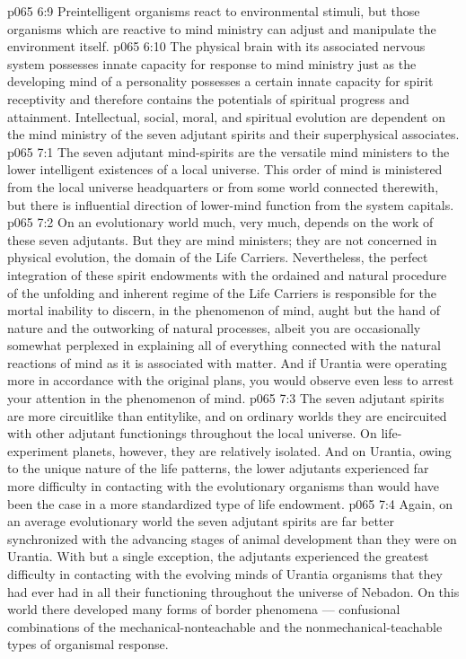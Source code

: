 \vs p065 6:9 Preintelligent organisms react to environmental stimuli, but those organisms which are reactive to mind ministry can adjust and manipulate the environment itself.
\vs p065 6:10 The physical brain with its associated nervous system possesses innate capacity for response to mind ministry just as the developing mind of a personality possesses a certain innate capacity for spirit receptivity and therefore contains the potentials of spiritual progress and attainment. Intellectual, social, moral, and spiritual evolution are dependent on the mind ministry of the seven adjutant spirits and their superphysical associates.
\vs p065 7:1 The seven adjutant mind\hyp{}spirits are the versatile mind ministers to the lower intelligent existences of a local universe. This order of mind is ministered from the local universe headquarters or from some world connected therewith, but there is influential direction of lower\hyp{}mind function from the system capitals.
\vs p065 7:2 On an evolutionary world much, very much, depends on the work of these seven adjutants. But they are mind ministers; they are not concerned in physical evolution, the domain of the Life Carriers. Nevertheless, the perfect integration of these spirit endowments with the ordained and natural procedure of the unfolding and inherent regime of the Life Carriers is responsible for the mortal inability to discern, in the phenomenon of mind, aught but the hand of nature and the outworking of natural processes, albeit you are occasionally somewhat perplexed in explaining all of everything connected with the natural reactions of mind as it is associated with matter. And if Urantia were operating more in accordance with the original plans, you would observe even less to arrest your attention in the phenomenon of mind.
\vs p065 7:3 The seven adjutant spirits are more circuitlike than entitylike, and on ordinary worlds they are encircuited with other adjutant functionings throughout the local universe. On life\hyp{}experiment planets, however, they are relatively isolated. And on Urantia, owing to the unique nature of the life patterns, the lower adjutants experienced far more difficulty in contacting with the evolutionary organisms than would have been the case in a more standardized type of life endowment.
\vs p065 7:4 Again, on an average evolutionary world the seven adjutant spirits are far better synchronized with the advancing stages of animal development than they were on Urantia. With but a single exception, the adjutants experienced the greatest difficulty in contacting with the evolving minds of Urantia organisms that they had ever had in all their functioning throughout the universe of Nebadon. On this world there developed many forms of border phenomena --- confusional combinations of the mechanical\hyp{}nonteachable and the nonmechanical\hyp{}teachable types of organismal response.
